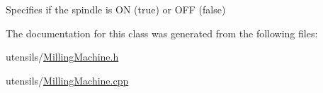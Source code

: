 Specifies if the spindle is O\+N (true) or O\+F\+F (false) 



The documentation for this class was generated from the following files\+:\begin{DoxyCompactItemize}
\item 
utensils/\hyperlink{_milling_machine_8h}{Milling\+Machine.\+h}\item 
utensils/\hyperlink{_milling_machine_8cpp}{Milling\+Machine.\+cpp}\end{DoxyCompactItemize}
